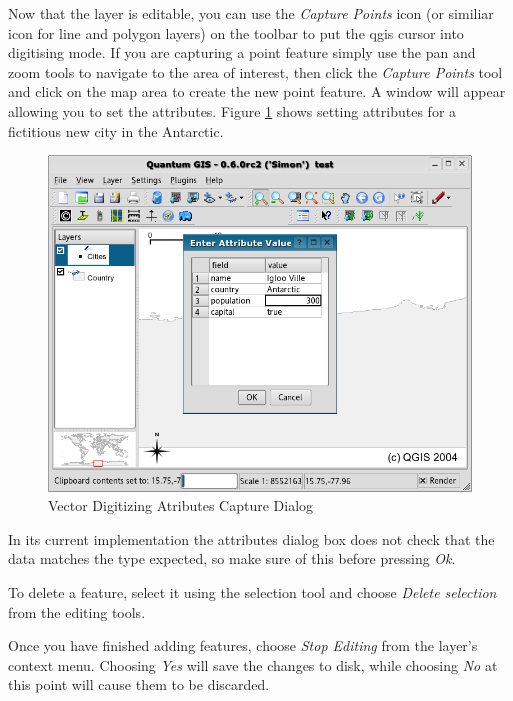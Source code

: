 Now that the layer is editable, you can use the \textit{Capture Points} icon (or
similiar icon for line and polygon layers) on the toolbar to put the qgis cursor
into digitising mode. If you are capturing a point feature simply use the pan
and zoom tools to navigate to the area of interest, then click the
\textit{Capture Points} tool and click on the map area to create the  
new point feature. A window will appear allowing you to set the attributes.
Figure \ref{fig:vector_digitising} shows setting attributes for a fictitious
new city in the Antarctic.

\begin{figure}[h]
   \begin{center}
   \caption{Vector Digitizing Atributes Capture Dialog}\label{fig:vector_digitising}\smallskip
   \includegraphics[scale=.5]{qgis_user_guide_images/digitising_attributes}
\end{center}  
\end{figure}

In its current implementation the attributes dialog box does not check that the
data matches the type expected, so make sure of this before
pressing \textit{Ok}. 

To delete a feature, select it using the selection tool and choose
\textit{Delete selection} from the editing tools.

Once you have finished adding features, choose \textit{Stop Editing} from the
layer's context menu. Choosing \textit{Yes} will save the changes to disk, while
choosing \textit{No} at this point will cause them to be discarded.

